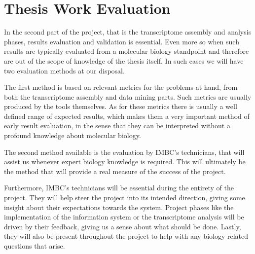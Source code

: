 \section{Thesis Work Evaluation}\label{sec:eval}

In the second part of the project, that is the transcriptome assembly and
analysis phases, results evaluation and validation is essential. Even more so
when such results are typically evaluated from a molecular biology standpoint and
therefore are out of the scope of knowledge of the thesis itself. In such cases
we will have two evaluation methods at our disposal.

The first method is based on relevant metrics for the problems at hand, from
both the transcriptome assembly and data mining parts. Such metrics are usually
produced by the tools themselves. As for these metrics there is usually a well
defined range of expected results, which makes them a very important method of early
result evaluation, in the sense that they can be interpreted without a profound
knowledge about molecular biology.

The second method available is the evaluation by IMBC's technicians, that will
assist us whenever expert biology knowledge is required. This will ultimately be
the method that will provide a real measure of the success of the project.

Furthermore, IMBC's technicians will be essential during the entirety of the project. They
will help steer the project into its intended direction, giving some insight
about their expectations towards the system. Project phases like the
implementation of the information system or the transcriptome analysis will be
driven by their feedback, giving us a sense about what should be done. Lastly,
they will also be present throughout the project to help with any biology
related questions that arise.
